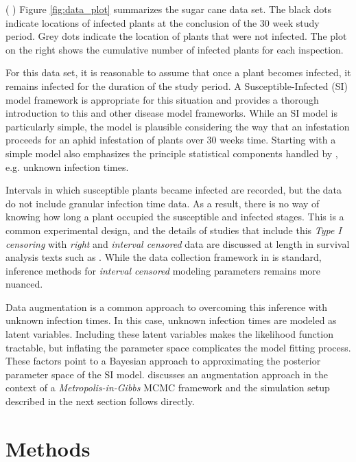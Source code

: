 \documentclass{uwstat572}
\newcommand{\vmcomment}[1]{({\color{blue}{VM's comment:}} \textbf{\color{blue}{#1}})}
\begin{document}
\vmcomment{Add axis labels to the left plot: ``grid dimension 1" and ``grid dimension 2".} 
Figure \ref{fig:data_plot} summarizes the sugar cane data set. The black dots indicate locations of infected plants at the conclusion of the 30 week study period. Grey dots indicate the location of plants that were not infected. The plot on the right shows the cumulative number of infected plants for each inspection. 

For this data set, it is reasonable to assume that once a plant becomes infected, it remains infected for the duration of the study period. 
A Susceptible-Infected (SI) model framework is appropriate for this situation and \citet{Jewell} provides a thorough introduction to this and other disease model frameworks. 
While an SI model is particularly simple, the model is plausible considering the way that an infestation proceeds for an aphid infestation of plants over 30 weeks time. 
Starting with a simple model also emphasizes the principle statistical components handled by \citet{Brown}, e.g. unknown infection times. 

Intervals in which susceptible plants became infected are recorded, but the data do not include granular infection time data.  
As a result, there is no way of knowing how long a plant occupied the susceptible and infected stages.
This is a common experimental design, and the details of studies that include this \textit{Type I censoring} with \textit{right} and \textit{interval censored} data are discussed at length in survival analysis texts such as \citet{Klein}. 
While the data collection framework in \citet{Brown} is standard, inference methods for \textit{interval censored} modeling parameters remains more nuanced.

Data augmentation is a common approach to overcoming this inference with unknown infection times. 
In this case, unknown infection times are modeled as latent variables. 
Including these latent variables makes the likelihood function tractable, but inflating the parameter space complicates the model fitting process. 
These factors point to a Bayesian approach to approximating the posterior parameter space of the SI model. 
\citet{Jewell} discusses an augmentation approach in the context of a \textit{Metropolis-in-Gibbs} MCMC framework and the simulation setup described in the next section follows directly. 


\section{Methods}
\end{document}
